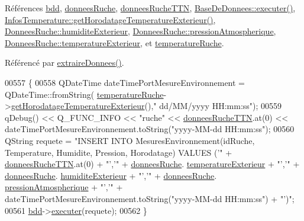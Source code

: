 Références \hyperlink{class_ruche_a8577fdedabdecd98652e338e83bb3b65}{bdd}, \hyperlink{class_ruche_a1526bfa78f03e0710ad16f880a40c15f}{donnees\+Ruche}, \hyperlink{class_ruche_a4556832042641c08a6ef2ab9d80d771e}{donnees\+Ruche\+T\+TN}, \hyperlink{class_base_de_donnees_aa8de5f8f8bb17edc43f5c0ee33712081}{Base\+De\+Donnees\+::executer()}, \hyperlink{class_infos_temperature_a76b07dc0790718e134e306fe760e6cbf}{Infos\+Temperature\+::get\+Horodatage\+Temperature\+Exterieur()}, \hyperlink{struct_donnees_ruche_ad97156720e4e08cd7aa545cdb8f3822f}{Donnees\+Ruche\+::humidite\+Exterieur}, \hyperlink{struct_donnees_ruche_ad34347d2201eeae5834fd5dc4d0ed512}{Donnees\+Ruche\+::pression\+Atmospherique}, \hyperlink{struct_donnees_ruche_aebc52e7707ccf6ae31d2150533cfb0ba}{Donnees\+Ruche\+::temperature\+Exterieur}, et \hyperlink{class_ruche_af721fb92f801a9b1f3ef3aa9867cf3de}{temperature\+Ruche}.



Référencé par \hyperlink{class_ruche_a21c0dafeaec03d451590037343e6a3ca}{extraire\+Donnees()}.


\begin{DoxyCode}
00557 \{
00558     QDateTime dateTimePortMesureEnvironnement = QDateTime::fromString(
      \hyperlink{class_ruche_af721fb92f801a9b1f3ef3aa9867cf3de}{temperatureRuche}->\hyperlink{class_infos_temperature_a76b07dc0790718e134e306fe760e6cbf}{getHorodatageTemperatureExterieur}(),\textcolor{stringliteral}{"
      dd/MM/yyyy HH:mm:ss"});
00559     qDebug() << Q\_FUNC\_INFO << \textcolor{stringliteral}{"ruche"} << \hyperlink{class_ruche_a4556832042641c08a6ef2ab9d80d771e}{donneesRucheTTN}.at(0) << 
      dateTimePortMesureEnvironnement.toString(\textcolor{stringliteral}{"yyyy-MM-dd  HH:mm:ss"});
00560     QString requete = \textcolor{stringliteral}{"INSERT INTO MesuresEnvironnement(idRuche, Temperature, Humidite, Pression,
       Horodatage) VALUES ('"} + \hyperlink{class_ruche_a4556832042641c08a6ef2ab9d80d771e}{donneesRucheTTN}.at(0) + \textcolor{stringliteral}{"','"}  + \hyperlink{class_ruche_a1526bfa78f03e0710ad16f880a40c15f}{donneesRuche}.
      \hyperlink{struct_donnees_ruche_aebc52e7707ccf6ae31d2150533cfb0ba}{temperatureExterieur} + \textcolor{stringliteral}{"','"} + \hyperlink{class_ruche_a1526bfa78f03e0710ad16f880a40c15f}{donneesRuche}.
      \hyperlink{struct_donnees_ruche_ad97156720e4e08cd7aa545cdb8f3822f}{humiditeExterieur} + \textcolor{stringliteral}{"','"} + \hyperlink{class_ruche_a1526bfa78f03e0710ad16f880a40c15f}{donneesRuche}.
      \hyperlink{struct_donnees_ruche_ad34347d2201eeae5834fd5dc4d0ed512}{pressionAtmospherique} + \textcolor{stringliteral}{"','"} + dateTimePortMesureEnvironnement.toString(\textcolor{stringliteral}{"yyyy-MM-dd 
       HH:mm:ss"}) + \textcolor{stringliteral}{"')"};
00561     \hyperlink{class_ruche_a8577fdedabdecd98652e338e83bb3b65}{bdd}->\hyperlink{class_base_de_donnees_aa8de5f8f8bb17edc43f5c0ee33712081}{executer}(requete);
00562 \}
\end{DoxyCode}
\mbox{\label{class_ruche_aa61f6dd8b15e5242ef3a3bdd87cca4a3}} 
